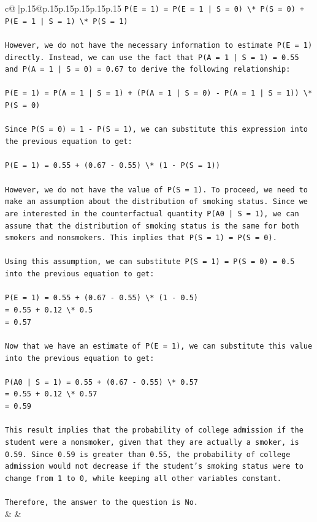 \documentclass{article}
\begin{document}
{\begin{supertabular}{c@{$\;$}|p{.15\linewidth}@{}p{.15\linewidth}p{.15\linewidth}p{.15\linewidth}p{.15\linewidth}p{.15\linewidth}}
{{{\texttt{P(E = 1) = P(E = 1 | S = 0) \textbackslash{}* P(S = 0) + P(E = 1 | S = 1) \textbackslash{}* P(S = 1)} \\
\\ 
\texttt{However, we do not have the necessary information to estimate P(E = 1) directly. Instead, we can use the fact that P(A = 1 | S = 1) = 0.55 and P(A = 1 | S = 0) = 0.67 to derive the following relationship:} \\
\\ 
\texttt{P(E = 1) = P(A = 1 | S = 1) + (P(A = 1 | S = 0) {-} P(A = 1 | S = 1)) \textbackslash{}* P(S = 0)} \\
\\ 
\texttt{Since P(S = 0) = 1 {-} P(S = 1), we can substitute this expression into the previous equation to get:} \\
\\ 
\texttt{P(E = 1) = 0.55 + (0.67 {-} 0.55) \textbackslash{}* (1 {-} P(S = 1))} \\
\\ 
\texttt{However, we do not have the value of P(S = 1). To proceed, we need to make an assumption about the distribution of smoking status. Since we are interested in the counterfactual quantity P(A0 | S = 1), we can assume that the distribution of smoking status is the same for both smokers and nonsmokers. This implies that P(S = 1) = P(S = 0).} \\
\\ 
\texttt{Using this assumption, we can substitute P(S = 1) = P(S = 0) = 0.5 into the previous equation to get:} \\
\\ 
\texttt{P(E = 1) = 0.55 + (0.67 {-} 0.55) \textbackslash{}* (1 {-} 0.5)} \\
\texttt{= 0.55 + 0.12 \textbackslash{}* 0.5} \\
\texttt{= 0.57} \\
\\ 
\texttt{Now that we have an estimate of P(E = 1), we can substitute this value into the previous equation to get:} \\
\\ 
\texttt{P(A0 | S = 1) = 0.55 + (0.67 {-} 0.55) \textbackslash{}* 0.57} \\
\texttt{= 0.55 + 0.12 \textbackslash{}* 0.57} \\
\texttt{= 0.59} \\
\\ 
\texttt{This result implies that the probability of college admission if the student were a nonsmoker, given that they are actually a smoker, is 0.59. Since 0.59 is greater than 0.55, the probability of college admission would not decrease if the student's smoking status were to change from 1 to 0, while keeping all other variables constant.} \\
\\ 
\texttt{Therefore, the answer to the question is No.} \\
            }
        }
    }
    & & \\ \\


\end{supertabular}}
\end{document}

